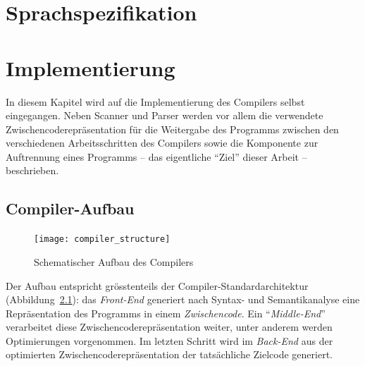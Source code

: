 \documentclass[twoside,a4paper,fleqn,12pt]{book}
\begin{document}


\chapter{Sprachspezifikation}
\label{langspec}



\chapter{Implementierung}
\label{implementation}

In diesem Kapitel wird auf die Implementierung des Compilers selbst eingegangen. 
Neben Scanner und Parser werden vor allem die verwendete Zwischencoderepräsentation
für die Weitergabe des Programms zwischen den verschiedenen Arbeitsschritten des Compilers 
sowie die Komponente zur Auftrennung eines Programms -- das eigentliche "`Ziel"' dieser Arbeit -- beschrieben.

\section{Compiler-Aufbau}
\begin{figure}[h]
   \centering
  \texttt{[image: compiler\_structure]}
  \caption{Schematischer Aufbau des Compilers}
  \label{fig:structure}
\end{figure}

Der Aufbau entspricht grösstenteils der Compiler-Standardarchitektur (Abbildung~\ref{fig:structure}): das \emph{Front-End} generiert nach Syntax- und Semantikanalyse
eine Repräsentation des Programms in einem \emph{Zwischencode}.
Ein "`\emph{Middle-End}"' verarbeitet diese Zwischencoderepräsentation weiter, unter anderem werden Optimierungen vorgenommen.
Im letzten Schritt wird im \emph{Back-End} aus der optimierten Zwischencoderepräsentation der tatsächliche Zielcode generiert.
\end{document}
